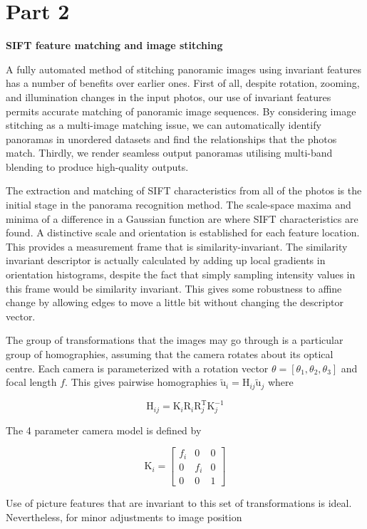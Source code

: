 \documentclass[conference]{IEEEtran}
\begin{document}
\section{Part 2}
\textbf{SIFT feature matching and image stitching}

A fully automated method of stitching panoramic images using invariant features has a number of benefits over earlier ones. First of all, despite rotation, zooming, and illumination changes in the input photos, our use of invariant features permits accurate matching of panoramic image sequences. By considering image stitching as a multi-image matching issue, we can automatically identify panoramas in unordered datasets and find the relationships that the photos match. Thirdly, we render seamless output panoramas utilising multi-band blending to produce high-quality outputs.

The extraction and matching of SIFT characteristics from all of the photos is the initial stage in the panorama recognition method. The scale-space maxima and minima of a difference in a Gaussian function are where SIFT characteristics are found. A distinctive scale and orientation is established for each feature location. This provides a measurement frame that is similarity-invariant. The similarity invariant descriptor is actually calculated by adding up local gradients in orientation histograms, despite the fact that simply sampling intensity values in this frame would be similarity invariant. This gives some robustness to affine change by allowing edges to move a little bit without changing the descriptor vector. 

The group of transformations that the images may go through is a particular group of homographies, assuming that the camera rotates about its optical centre. Each camera is parameterized with a rotation vector \( \theta = [\theta_1, \theta_2, \theta_3] \) and focal length \( f \). This gives pairwise homographies \( \mathrm{\tilde{u}}_i = \mathrm{H}_{ij}\mathrm{\tilde{u}}_j \) where 

\[ \mathrm{H}_{ij} = \mathrm{K}_i\mathrm{R}_i\mathrm{R}_j^\mathrm{T}\mathrm{K}_j^{-1} \]

The 4 parameter camera model is defined by

\[ \mathrm{K}_i = \begin{bmatrix}
f_i & 0 & 0  \\
 0 & f_i & 0  \\
 0 & 0 & 1 
\end{bmatrix}\]

Use of picture features that are invariant to this set of transformations is ideal. Nevertheless, for minor adjustments to image position
\end{document}
